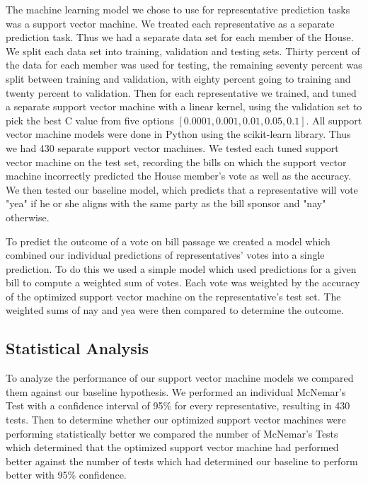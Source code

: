 \documentclass[11pt,letterpaper,twocolumn]{article}
\begin{document}
The machine learning model we chose to use for representative prediction tasks was a support vector machine. We treated each representative as a separate prediction task. Thus we had a separate data set for each member of the House. We split each data set into training, validation and testing sets. Thirty percent of the data for each member was used for testing, the remaining seventy percent was split between training and validation, with eighty percent going to training and twenty percent to validation. Then for each representative we trained, and tuned a separate support vector machine with a linear kernel, using the validation set to pick the best C value from five options $[0.0001, 0.001, 0.01, 0.05, 0.1]$. All support vector machine models were done in Python using the scikit-learn library. Thus we had 430 separate support vector machines. We tested each tuned support vector machine on the test set, recording the bills on which the support vector machine incorrectly predicted the House member's vote as well as the accuracy. We then tested our baseline model, which predicts that a representative will vote "yea" if he or she aligns with the same party as the bill sponsor and "nay" otherwise. 

To predict the outcome of a vote on bill passage we created a model which combined our individual predictions of representatives' votes into a single prediction. To do this we used a simple model which used predictions for a given bill to compute a weighted sum of votes. Each vote was weighted by the accuracy of the optimized support vector machine on the representative's test set. The weighted sums of nay and yea were then compared to determine the outcome.

\subsection{Statistical Analysis}

To analyze the performance of our support vector machine models we compared them against our baseline hypothesis. We performed an individual McNemar's Test with a confidence interval of 95\% for every representative, resulting in 430 tests. Then to determine whether our optimized support vector machines were performing statistically better we compared the number of McNemar's Tests which determined that the optimized support vector machine had performed better against the number of tests which had determined our baseline to perform better with 95\% confidence.
\end{document}
